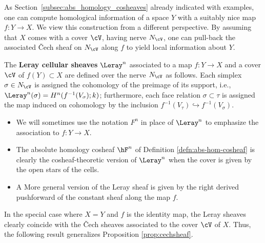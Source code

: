 As Section~\ref{subsec:abs_homology_cosheaves} already indicated with examples, one can compute homological information of a space $Y$ with a suitably nice map $f:Y\to X$. We view this construction from a different perspective. By assuming that $X$ comes with a cover $\cV$, having nerve $N_\cV$, one can pull-back the associated \v{C}ech sheaf on $N_\cV$ along $f$ to yield local information about $Y$.

\begin{defn}
The {\bf Leray cellular sheaves} $\Leray^n$ associated to a map $f:Y\to X$ and a cover $\cV$ of $f(Y) \subset X$ are defined over the nerve $N_\cV$ as follows. Each simplex $\sigma \in N_\cV$ is assigned the cohomology of the preimage of its support, i.e., $\Leray^n(\sigma) = H^n(f^{-1}(V_\sigma);k)$; furthermore, each face relation $\sigma \subset \tau$ is assigned the map induced on cohomology by the inclusion $f^{-1}(V_\tau) \hookrightarrow f^{-1}(V_\sigma)$.
\end{defn}
\begin{rmk}
\begin{itemize}
\item We will sometimes use the notation $F^n$ in place of $\Leray^n$ to emphasize the association to $f:Y\to X$. 
\item The absolute homology cosheaf $\hF^n$ of Definition \ref{defn:abs-hom-cosheaf} is clearly the cosheaf-theoretic version of $\Leray^n$ when the cover is given by the open stars of the cells.
\item A More general version of the Leray sheaf is given by the right derived pushforward of the constant sheaf along the map $f$.
\end{itemize}
\end{rmk}

In the special case where $X = Y$ and $f$ is the identity map, the Leray sheaves clearly coincide with the \v{C}ech sheaves associated to the cover $\cV$ of $X$. Thus, the following result generalizes Proposition \ref{prop:cechsheaf}.

